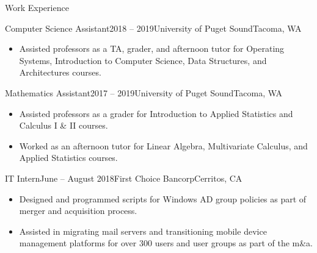 \documentclass{resume} %
\begin{document}

\begin{rSection}{Work Experience}

\begin{rSubsection}{Computer Science Assistant}{2018 -- 2019}{University of Puget Sound}{Tacoma, WA}
\renewcommand\labelitemi{$\cdot$}
\begin{itemize}
\setlength\itemsep{-0.25em}
\item Assisted professors as a TA, grader, and afternoon tutor for Operating Systems, Introduction to Computer Science, Data Structures, and Architectures courses. 
\end{itemize}
\end{rSubsection}


\begin{rSubsection}{Mathematics Assistant}{2017 -- 2019}{University of Puget Sound}{Tacoma, WA}
\renewcommand\labelitemi{$\cdot$}
\begin{itemize}
\setlength\itemsep{-0.25em}
\item Assisted professors as a grader for Introduction to Applied Statistics and Calculus I \& II courses.
\item Worked as an afternoon tutor for Linear Algebra, Multivariate Calculus, and Applied Statistics courses.
\end{itemize}
\end{rSubsection}


\begin{rSubsection}{IT Intern}{June -- August 2018}{First Choice Bancorp}{Cerritos, CA}
\renewcommand\labelitemi{$\cdot$}
\begin{itemize}
\setlength\itemsep{-0.25em}
\item Designed and programmed scripts for Windows AD group policies as part of merger and acquisition process.
\item Assisted in migrating mail servers and transitioning mobile device management platforms for over 300 users and user groups as part of the m\&a.
\end{itemize}
\end{rSubsection}


\end{rSection}
\end{document}
